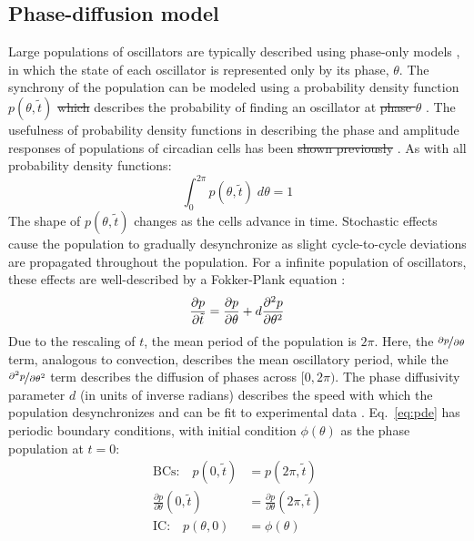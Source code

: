 \documentclass[11pt, letterpaper]{article}
\providecommand{\DIFadd}[1]{{\protect\color{blue}\uwave{#1}}} %
\providecommand{\DIFdel}[1]{{\protect\color{red}\sout{#1}}}                      %
\providecommand{\DIFaddbegin}{} %
\providecommand{\DIFaddend}{} %
\providecommand{\DIFdelbegin}{} %
\providecommand{\DIFdelend}{} %
\begin{document}
\subsection*{Phase-diffusion model}
Large populations of oscillators are typically described using phase-only models
\cite{Rougemont2006}, in which the state of each oscillator is represented only
by its phase, $\theta$. The synchrony of the population can be modeled using a
probability density function $p(\theta, \tilde{t})$ \DIFdelbegin \DIFdel{which }\DIFdelend \DIFaddbegin \DIFadd{that }\DIFaddend describes the
probability of finding an oscillator at \DIFdelbegin \DIFdel{phase $\theta$ }\DIFdelend \DIFaddbegin \DIFadd{each phase }\DIFaddend \cite{Kuramoto1984}. The
usefulness of probability density functions in describing the phase and
amplitude responses of populations of circadian cells has been \DIFdelbegin \DIFdel{shown previously }\DIFdelend \DIFaddbegin \DIFadd{previously shown
}\DIFaddend \cite{Ukai2007}. As with all probability density functions:
\begin{equation}
  \int_0^{2\pi} p(\theta, \tilde{t}) \; d\theta = 1
\end{equation}
The shape of $p(\theta, \tilde{t})$ changes as the cells advance in time.
Stochastic effects cause the population to gradually desynchronize as slight
cycle-to-cycle deviations are propagated throughout the population. For a
infinite population of oscillators, these effects are well-described by a
Fokker-Plank equation \cite{Stein1965}:
\begin{equation}
  \frac{\partial p}{\partial \tilde{t}} = \frac{\partial
  p}{\partial \theta} + d\frac{\partial^2 p}{\partial \theta^2}\\
  \label{eq:pde}
\end{equation}
Due to the rescaling of $t$, the mean period of the population is $2\pi$. Here,
the $\nicefrac{\partial p}{\partial \theta}$ term, analogous to convection,
describes the mean oscillatory period, while the $\nicefrac{\partial^2
p}{\partial \theta^2}$ term describes the diffusion of phases across $[0,
2\pi)$. The phase diffusivity parameter $d$ (in units of inverse radians)
describes the speed with which the population desynchronizes and can be fit to
experimental data \DIFaddbegin \cite{Rougemont2007}\DIFaddend . Eq.~\ref{eq:pde} has periodic boundary
conditions, with initial condition $\phi(\theta)$ as the phase population at
$t=0$:
\begin{align}
  \text{BCs:}\quad p(0, \tilde{t}) &= p(2\pi, \tilde{t}) \\
  \frac{\partial p}{\partial \theta}(0, \tilde{t}) &= \frac{\partial p}{\partial
  \theta}(2\pi, \tilde{t}) \\
  \text{IC:}\quad p(\theta, 0) &= \phi(\theta)\label{eq:pde_ic}
\end{align}
\end{document}
